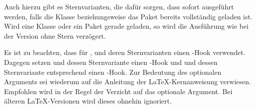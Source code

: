 Auch%
hierzu gibt es Sternvarianten, die dafür sorgen, dass 
sofort ausgeführt werden, falls die Klasse beziehungsweise das Paket bereits
vollständig geladen ist. Wird eine Klasse oder ein Paket gerade geladen, so
wird die Ausführung wie bei der Version ohne Stern verzögert.

Es ist zu beachten, dass  für ,
 und deren Sternvarianten einen -Hook
verwendet. Dagegen setzen  und dessen Sternvariante
einen -Hook und  und dessen
Sternvariante entsprechend einen -Hook. Zur Bedeutung
des optionalen Arguments  sei wiederum auf die Anleitung der
\LaTeX-Kernanweisung 
verwiesen. Empfohlen wird in der Regel der Verzicht auf das optionale
Argument. Bei älteren \LaTeX-Versionen wird dieses ohnehin ignoriert.

